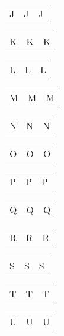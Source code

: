 \documentclass{minimal}
\begin{document}
\begin{longtable}{p{2.8cm}p{2.8cm}p{2.8cm}}
J & J & J
\end{longtable}

\begin{longtable}{p{2.8cm}p{2.8cm}p{2.8cm}}
K & K & K
\end{longtable}

\begin{longtable}{p{2.8cm}p{2.8cm}p{2.8cm}}
L & L & L
\end{longtable}

\begin{longtable}{p{2.8cm}p{2.8cm}p{2.8cm}}
M & M & M
\end{longtable}

\begin{longtable}{p{2.8cm}p{2.8cm}p{2.8cm}}
N & N & N
\end{longtable}

\begin{longtable}{p{2.8cm}p{2.8cm}p{2.8cm}}
O & O & O
\end{longtable}

\begin{longtable}{p{2.8cm}p{2.8cm}p{2.8cm}}
P & P & P
\end{longtable}

\begin{longtable}{p{2.8cm}p{2.8cm}p{2.8cm}}
Q & Q & Q
\end{longtable}

\begin{longtable}{p{2.8cm}p{2.8cm}p{2.8cm}}
R & R & R
\end{longtable}

\begin{longtable}{p{2.8cm}p{2.8cm}p{2.8cm}}
S & S & S
\end{longtable}

\begin{longtable}{p{2.8cm}p{2.8cm}p{2.8cm}}
T & T & T
\end{longtable}

\begin{longtable}{p{2.8cm}p{2.8cm}p{2.8cm}}
U & U & U
\end{longtable}
\end{document}
